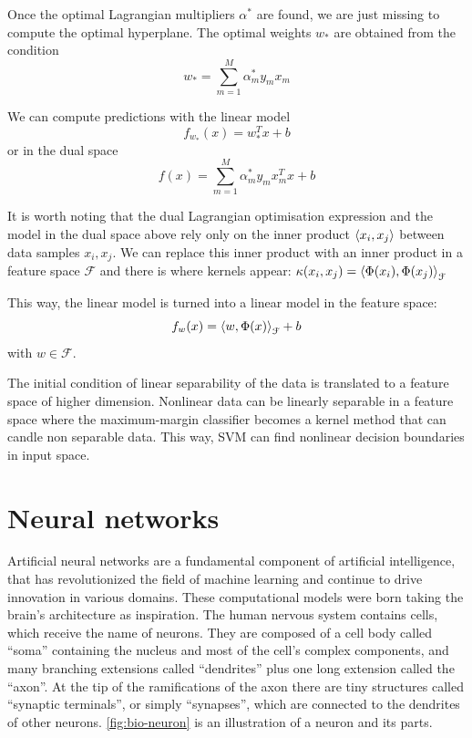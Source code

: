 Once the optimal Lagrangian multipliers $\alpha^*$ are found, we are just missing to compute the optimal hyperplane. The optimal weights $w_*$ are obtained from the condition 
$$w_* = \sum_{m=1}^M \alpha_m^* y_m x_m$$

We can compute predictions with the linear model 
$$f_{w_*}(x) = w_*^T x + b$$
or in the dual space
$$f(x) = \sum_{m=1}^M \alpha_m^* y_m x_m^T x +b$$

It is worth noting that the dual Lagrangian optimisation expression and the model in the dual space above rely only on the inner product $\braket{x_i,x_j }$ between data samples $x_i, x_j$. We can replace this inner product with an inner product in a feature space $\mathcal{F}$ and there is where kernels appear: $\kappa(x_i,x_j)=\braket{\Phi(x_i),\Phi(x_j)}_{\mathcal{F}}$ 

This way, the linear model is turned into a linear model in the feature space:
$$f_w(x) = \braket{w, \Phi(x)}_{\mathcal{F}} + b$$
with $w \in \mathcal{F}$.

The initial condition of linear separability of the data is translated to a feature space of higher dimension. Nonlinear data can be linearly separable in a feature space where the maximum-margin classifier becomes a kernel method that can candle non separable data. This way, SVM can find nonlinear decision boundaries in input space. 


\section{Neural networks}

Artificial neural networks are a fundamental component of artificial intelligence, that has revolutionized the field of machine learning and continue to drive innovation in various domains. These computational models were born taking the brain's architecture as inspiration. The human nervous system contains cells, which receive the name of neurons. They are composed of a cell body called ``soma'' containing the nucleus and most of the cell's complex components, and many branching extensions called ``dendrites'' plus one long extension called the ``axon''. At the tip of the ramifications of the axon there are tiny structures called ``synaptic terminals'', or simply ``synapses'', which are connected to the dendrites of other neurons. \autoref{fig:bio-neuron} is an illustration of a neuron and its parts.

